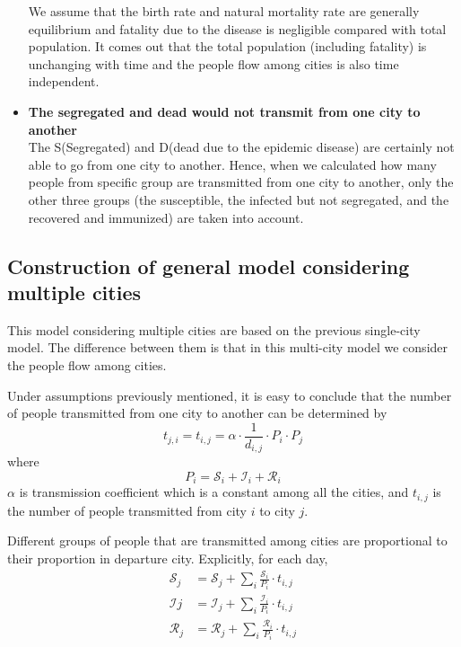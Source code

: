 \begin{itemize}
We assume that the birth rate and natural mortality rate are generally equilibrium and fatality due to the disease is negligible compared with total population. It comes out that the total population (including fatality) is unchanging with time and the people flow among cities is also time independent.

  \item \textbf{The segregated and dead would not transmit from one city to another}\\
The S(Segregated) and D(dead due to the epidemic disease) are certainly not able to go from one city to another. Hence, when we calculated how many people from specific group are transmitted from one city to another, only the other three groups (the susceptible, the infected but not segregated, and the recovered and immunized) are taken into account.
\end{itemize}

\subsection{Construction of general model considering multiple cities}
This model considering multiple cities are based on the previous single-city model. The difference between them is that in this multi-city model we consider the people flow among cities.

Under assumptions previously mentioned, it is easy to conclude that the number of people transmitted from one city to another can be determined by 
\begin{equation}
t_{j,i} = t_{i,j}=\alpha \cdot\frac{1}{d_{i,j}}\cdot P_{i}\cdot P_{j}
\end{equation}
where
\begin{equation}
P_{i}=\mathcal{S}_{i}+\mathcal{I}_{i}+\mathcal{R}_{i}
\end{equation}
$\alpha$ is transmission coefficient which is a constant among all the cities, and $t_{i,j}$ is the number of people transmitted from city $i$ to city $j$.

Different groups of people that are transmitted among cities are proportional to their proportion in departure city. Explicitly, for each day,
 \begin{align}\label{group}
    \mathcal{S}_{j}&=\mathcal{S}_{j}+\sum_i \frac{\mathcal{S}_{i}}{P_{i}}\cdot t_{i,j}\\
    \mathcal{I}{j}&=\mathcal{I}_{j}+\sum_i \frac{\mathcal{I}_{i}}{P_{i}}\cdot t_{i,j}\\
    \mathcal{R}_{j}&=\mathcal{R}_{j}+\sum_i \frac{\mathcal{R}_{i}}{P_{i}}\cdot t_{i,j}
 \end{align}
 
